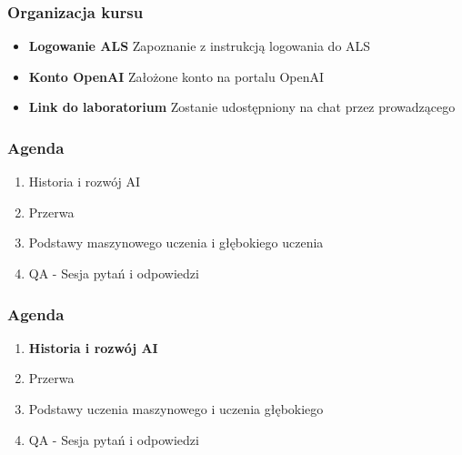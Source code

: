 \documentclass[smaller]{beamer}
\begin{document}

\begin{frame}
\frametitle{Organizacja kursu}

\begin{itemize}
    \item \textbf{Logowanie ALS} Zapoznanie z instrukcją logowania do ALS
    \item \textbf{Konto OpenAI} Założone konto na portalu OpenAI
    \item \textbf{Link do laboratorium} Zostanie udostępniony na chat przez prowadzącego
\end{itemize}

\end{frame}


\begin{frame}
\frametitle{Agenda}
\begin{enumerate}
    \item Historia i rozwój AI 
    \item Przerwa 
    \item Podstawy maszynowego uczenia i głębokiego uczenia
    \item QA - Sesja pytań i odpowiedzi 
\end{enumerate}
\end{frame}


\begin{frame}
\frametitle{Agenda}
\begin{enumerate}
    \item \textbf{\color{black}Historia i rozwój AI}
    \item \color{gray}Przerwa
    \item \color{gray}Podstawy uczenia maszynowego i uczenia głębokiego
    \item \color{gray}QA - Sesja pytań i odpowiedzi
\end{enumerate}
\end{frame}

\end{document}
